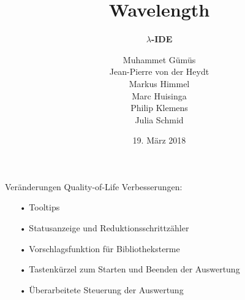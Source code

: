 \documentclass[10pt]{beamer}
\title[] %
{ %
      \textbf{Wavelength}
}
\subtitle[$\lambda$-IDE]
{
      \textbf{$\lambda$-IDE}
}
\author[wavelength]
{     
      Muhammet Gümüs \\
      Jean-Pierre von der Heydt \\  
       Markus Himmel \\
       Marc Huisinga \\
       Philip Klemens \\ 
       Julia Schmid   }
\institute[]
{
      
  
}
\date{19. März 2018}
\begin{document}

{
\begin{frame}[plain]
\maketitle
\end{frame}
}

\begin{frame}{Veränderungen}
Quality-of-Life Verbesserungen:
\begin{itemize}
	\item[•] Tooltips
	\item[•] Statusanzeige und Reduktionsschrittzähler
	\item[•] Vorschlagsfunktion für Bibliotheksterme
	\item[•] Tastenkürzel zum Starten und Beenden der Auswertung
	\item[•] Überarbeitete Steuerung der Auswertung
\end{itemize}
\end{frame}
\end{document}
